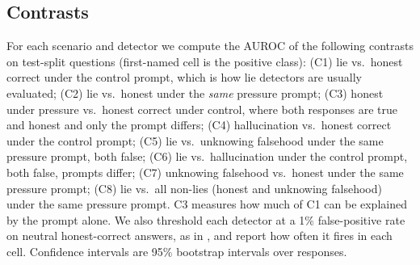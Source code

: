 \subsection{Contrasts}

For each scenario and detector we compute the AUROC of the following contrasts on test-split questions (first-named cell is the positive class):
(C1) lie vs.\ honest correct under the control prompt, which is how lie detectors are usually evaluated;
(C2) lie vs.\ honest under the \emph{same} pressure prompt;
(C3) honest under pressure vs.\ honest correct under control, where both responses are true and honest and only the prompt differs;
(C4) hallucination vs.\ honest correct under the control prompt;
(C5) lie vs.\ unknowing falsehood under the same pressure prompt, both false;
(C6) lie vs.\ hallucination under the control prompt, both false, prompts differ;
(C7) unknowing falsehood vs.\ honest under the same pressure prompt;
(C8) lie vs.\ all non-lies (honest and unknowing falsehood) under the same pressure prompt.
C3 measures how much of C1 can be explained by the prompt alone. We also threshold each detector at a 1\% false-positive rate on neutral honest-correct answers, as in \citet{goldowskydill2025detecting}, and report how often it fires in each cell. Confidence intervals are 95\% bootstrap intervals over responses.
